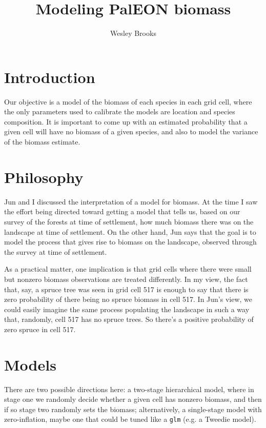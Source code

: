 \documentclass[authoryear, review, 11pt]{elsarticle}
\title{Modeling PalEON biomass}
\author{Wesley Brooks}
\date{}                                           %
\begin{document}
\maketitle


\section{Introduction}
Our objective is a  model of the biomass of each species in each grid cell, where the only parameters used to calibrate the models are location and species composition. It is important to come up with an estimated probability that a given cell will have no biomass of a given species, and also to model the variance of the biomass estimate.


\section{Philosophy}
Jun and I discussed the interpretation of a model for biomass. At the time I saw the effort being directed toward getting a model that tells us, based on our survey of the forests at time of settlement, how much biomass there was on the landscape at time of settlement. On the other hand, Jun says that the goal is to model the process that gives rise to biomass on the landscape, observed through the survey at time of settlement.

As a practical matter, one implication is that grid cells where there were small but nonzero biomass observations are treated differently. In my view, the fact that, say, a spruce tree was seen in grid cell 517 is enough to say that there is zero probability of there being no spruce biomass in cell 517. In Jun's view, we could easily imagine the same process populating the landscape in such a way that, randomly, cell 517 has no spruce trees. So there's a positive probability of zero spruce in cell 517.


\section{Models}
There are two possible directions here: a two-stage hierarchical model, where in stage one we randomly decide whether a given cell has nonzero biomass, and then if so stage two randomly sets the biomass; alternatively, a single-stage model with zero-inflation, maybe one that could be tuned like a \verb!glm! (e.g. a Tweedie model).
\end{document}
